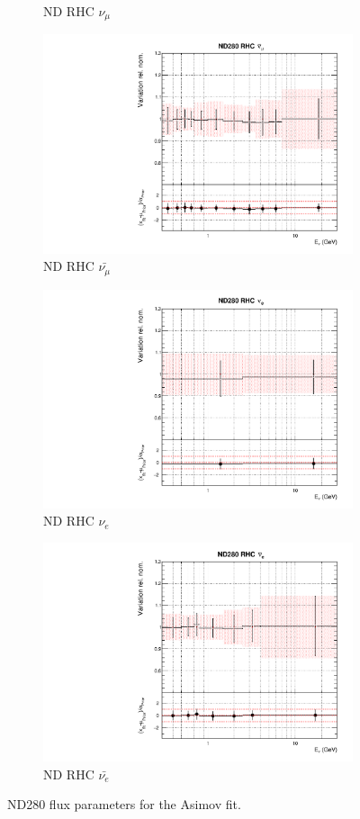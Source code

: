\begin{figure}[!htbp]
\begin{subfigure}{0.45\textwidth}
  \caption{ND RHC $\nu_{\mu}$}
\end{subfigure}
\begin{subfigure}{0.45\textwidth}
  \centering
  \includegraphics[width=0.75\linewidth]{figs/asmvfluxpoly5}
  \caption{ND RHC $\bar{\nu_{\mu}}$}
\end{subfigure}
\begin{subfigure}{0.45\textwidth}
  \centering
  \includegraphics[width=0.75\linewidth]{figs/asmvfluxpoly6}
  \caption{ND RHC $\nu_{e}$}
\end{subfigure}
\begin{subfigure}{0.45\textwidth}
  \centering
  \includegraphics[width=0.75\linewidth]{figs/asmvfluxpoly7}
  \caption{ND RHC $\bar{\nu_e}$}
\end{subfigure}
\caption{ND280 flux parameters for the Asimov fit.}
\label{fig:asmvfluxNDapp}
\end{figure}

